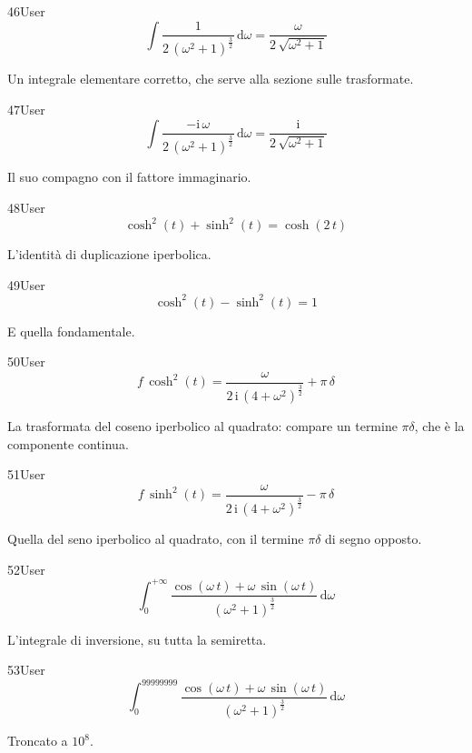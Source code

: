 \begin{espr}{46}{User}{}
\[
\int \frac{1}{2\, \left(\omega^{2} + 1\right)^{\frac{3}{2}}} \,\mathrm{d}\omega = \frac{\omega}{2\, \sqrt{\omega^{2} + 1}}
\]
\end{espr}
Un integrale elementare corretto, che serve alla sezione sulle trasformate.

\begin{espr}{47}{User}{}
\[
\int \frac{-\mathrm{i}\, \omega}{2\, \left(\omega^{2} + 1\right)^{\frac{3}{2}}} \,\mathrm{d}\omega = \frac{\mathrm{i}}{2\, \sqrt{\omega^{2} + 1}}
\]
\end{espr}
Il suo compagno con il fattore immaginario.

\begin{espr}{48}{User}{\verificata}
\[
\cosh^{2}\!\left(t\right) + \sinh^{2}\!\left(t\right) = \cosh\!\left(2\, t\right)
\]
\end{espr}
L'identità di duplicazione iperbolica.

\begin{espr}{49}{User}{\verificata}
\[
\cosh^{2}\!\left(t\right) - \sinh^{2}\!\left(t\right) = 1
\]
\end{espr}
E quella fondamentale.

\begin{espr}{50}{User}{}
\[
f\, \cosh^{2}\!\left(t\right) = \frac{\omega}{2\, \mathrm{i}\, \left(4 + \omega^{2}\right)^{\frac{3}{2}}} + \pi\, \delta
\]
\end{espr}
La trasformata del coseno iperbolico al quadrato: compare un termine $\pi\delta$, che è la componente continua.

\begin{espr}{51}{User}{}
\[
f\, \sinh^{2}\!\left(t\right) = \frac{\omega}{2\, \mathrm{i}\, \left(4 + \omega^{2}\right)^{\frac{3}{2}}} - \pi\, \delta
\]
\end{espr}
Quella del seno iperbolico al quadrato, con il termine $\pi\delta$ di segno opposto.

\begin{espr}{52}{User}{}
\[
\int_{0}^{+\infty} \frac{\cos\!\left(\omega\, t\right) + \omega\, \sin\!\left(\omega\, t\right)}{\left(\omega^{2} + 1\right)^{\frac{3}{2}}} \,\mathrm{d}\omega
\]
\end{espr}
L'integrale di inversione, su tutta la semiretta.

\begin{espr}{53}{User}{}
\[
\int_{0}^{99999999} \frac{\cos\!\left(\omega\, t\right) + \omega\, \sin\!\left(\omega\, t\right)}{\left(\omega^{2} + 1\right)^{\frac{3}{2}}} \,\mathrm{d}\omega
\]
\end{espr}
Troncato a $10^8$.


